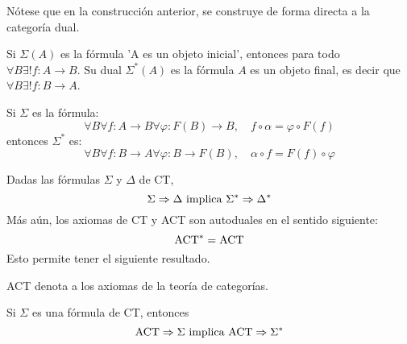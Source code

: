 \documentclass[12pt]{report}
\newcounter{it}
\theoremstyle{largebreak}
\newcommand\cf[3]{\ensuremath{#1:#2\rightarrow#3}}
\begin{document}
    \begin{obs}
        Nótese que en la construcción anterior, se construye de forma directa a la categoría dual.
    \end{obs}

    \begin{exa}
        Si $\Sigma(A)$ es la fórmula 'A es un objeto inicial', entonces para todo $\forall B\exists!\cf{f}{A}{B}$. Su dual $\Sigma^*(A)$ es la fórmula $A$ es un objeto final, es decir que $\forall B\exists!\cf{f}{B}{A}$. 
    \end{exa}

    \begin{exa}
        Si $\Sigma$ es la fórmula:
        \begin{equation*}
            \forall B\forall\cf{f}{A}{B}\forall\cf{\varphi}{F(B)}{B},\quad f\circ\alpha=\varphi\circ F(f)
        \end{equation*}
        entonces $\Sigma^*$ es:
        \begin{equation*}
            \forall B\forall \cf{f}{B}{A}\forall\cf{\varphi}{B}{F(B)},\quad\alpha\circ f=F(f)\circ\varphi
        \end{equation*}
    \end{exa}

    \begin{exa}
        Dadas las fórmulas $\Sigma$ y $\Delta$ de CT,
        \begin{equation*}
            \Sigma\Rightarrow\Delta\textup{ implica }\Sigma^*\Rightarrow\Delta^*
        \end{equation*}
        Más aún, los axiomas de CT y ACT son autoduales en el sentido siguiente:
        \begin{equation*}
            \textup{ACT}^*=\textup{ACT}
        \end{equation*}
        Esto permite tener el siguiente resultado.
    \end{exa}

    \begin{obs}
        ACT denota a los axiomas de la teoría de categorías.
    \end{obs}

    \begin{propo}
        Si $\Sigma$ es una fórmula de CT, entonces
        \begin{equation*}
            \textup{ACT}\Rightarrow\Sigma\textup{ implica }\textup{ACT}\Rightarrow\Sigma^*
        \end{equation*} 
    \end{propo}
\end{document}
